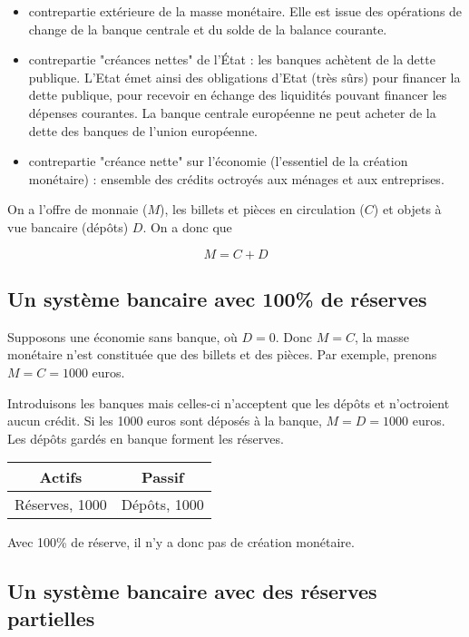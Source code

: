 \begin{itemize}
	\item contrepartie extérieure de la masse monétaire. Elle est issue des opérations de change de la banque centrale et du solde de la balance courante.
	
	\item contrepartie "créances nettes" de l'État : les banques achètent de la dette publique. L'Etat émet ainsi des obligations d'Etat (très sûrs) pour financer la dette publique, pour recevoir en échange des liquidités pouvant financer les dépenses courantes. La banque centrale européenne ne peut acheter de la dette des banques de l'union européenne.
	
	\item contrepartie "créance nette" sur l'économie (l'essentiel de la création monétaire) : ensemble des crédits octroyés aux ménages et aux entreprises.
\end{itemize}

On a l'offre de monnaie ($M$), les billets et pièces en circulation ($C$) et objets à vue bancaire (dépôts) $D$. On a donc que

	$$M = C + D$$



	\subsection{Un système bancaire avec 100\% de réserves}
	
	Supposons une économie sans banque, où $D = 0$. Donc $M = C$, la masse monétaire n'est constituée que des billets et des pièces. Par exemple, prenons $M = C = 1000$ euros.
	
	Introduisons les banques mais celles-ci n'acceptent que les dépôts et n'octroient aucun crédit. Si les 1000 euros sont déposés à la banque, $M = D = 1000$ euros. Les dépôts gardés en banque forment les réserves.
	
\begin{center}
 	\begin{tabular}{c|c}
	Actifs & Passif \\ 
	\hline 
	Réserves, 1000 & Dépôts, 1000
	\end{tabular}
 \end{center} 
	
	Avec 100\% de réserve, il n'y a donc pas de création monétaire.
	
	\subsection{Un système bancaire avec des réserves partielles}
	
